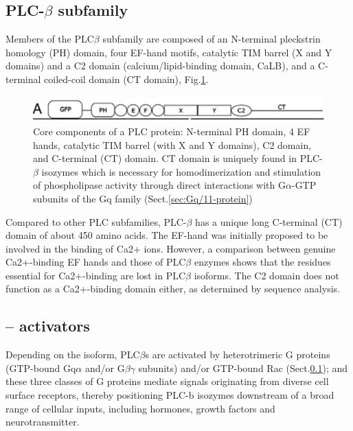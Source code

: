 \subsection[PLC-beta]{PLC-$\beta$ subfamily}
\label{sec:PLC-beta}

Members of the PLC$\beta$ subfamily are composed of an N-terminal
pleckstrin homology (PH) domain, four EF-hand motifs, catalytic TIM barrel (X
and Y domains) and a C2 domain (calcium/lipid-binding domain, CaLB), and a
C-terminal coiled-coil domain (CT domain), Fig.\ref{fig:PLC}.

\begin{figure}[hbt]
  \centerline{\includegraphics[height=1cm,
    angle=0]{./images/PLC.eps}}
  \caption{Core components of a PLC protein: N-terminal PH domain, 4 EF hands,
  catalytic TIM barrel (with X and Y domains), C2 domain, and C-terminal (CT)
  domain. CT domain is uniquely found in PLC-$\beta$ isozymes which is necessary
  for homodimerization and stimulation of phospholipase activity through direct
  interactions with G$\alpha$-GTP subunits of the Gq family (Sect.\ref{sec:Gq/11-protein})}
  \label{fig:PLC}
\end{figure}

Compared to other PLC subfamilies, PLC-$\beta$ has a unique long C-terminal (CT)
domain of about 450 amino acids. The EF-hand was initially proposed  to be
involved in the binding of Ca2+ ions. However, a comparison between genuine
Ca2+-binding EF hands and those of PLC$\beta$ enzymes shows that the residues
essential for Ca2+-binding are lost in PLC$\beta$ isoforms. The C2 domain does
not function as a Ca2+-binding domain either, as determined by sequence
analysis.

\subsection{-- activators}
\label{sec:PLC-activators}

Depending on the isoform, PLC$\beta$s are activated by heterotrimeric G proteins
(GTP-bound Gq$\alpha$ and/or G$\beta$$\gamma$ subunits) and/or GTP-bound Rac
(Sect.\ref{sec:PLC-beta}); and these three classes of G proteins mediate signals
originating from diverse cell surface receptors, thereby positioning PLC-b
isozymes downstream of a broad range of cellular inputs, including hormones,
growth factors and neurotransmitter.

